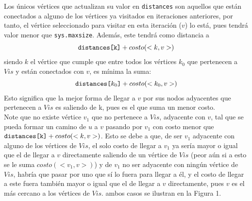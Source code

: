 \documentclass[a4paper,12pt,twocolumn]{article}
\begin{document}
			Los únicos vértices que actualizan su valor en \texttt{\ttfamily distances} son aquellos que están conectados a alguno de los vértices ya visitados en iteraciones anteriores, por tanto, el vértice seleccionado para visitar en esta iteración ($v$) lo está, pues tendrá valor menor que \texttt{\ttfamily sys.maxsize}. Además, este tendrá como distancia a $$\texttt{\ttfamily distances[k]}  +  costo(<k, v>)$$ siendo $k$ el vértice que cumple que entre todos los vértices $k_0$ que pertenecen a $Vis$ y están conectados con $v$, es mínima la suma:
			 $$ \texttt{\ttfamily distances[$k_0$]} + costo(<k_0,v>)$$
			Esto significa que la mejor forma de llegar a $v$ por sus nodos adyacentes que pertenecen a $Vis$ es saliendo de k, pues es el que suma un menor costo.\\
			Note que no existe vértice $v_1$ que no pertenece a $Vis$, adyacente con $v$, tal que se pueda formar un camino de $u$ a $v$ pasando por $v_1$ con costo menor que $\texttt{\ttfamily distances[k]} + costo(<k, v>)$.	Esto se debe a que, de ser $v_1$ adyacente con alguno de los vértices de $Vis$, el solo costo de llegar a $v_1$ ya sería mayor o igual que el de llegar a $v$ directamente saliendo de un vértice de $Vis$ (peor aún si a esto se le suma $costo(<v_1, v>)$) y de $v_1$ no ser adyacente con ningún vértice de $Vis$, habría que pasar por uno que sí lo fuera para llegar a él, y el costo de llegar a este fuera también mayor o igual que el de llegar a $v$ directamente, pues $v$ es el más cercano a los vértices de $Vis$. ambos casos se ilustran en la Figura 1.\\
\end{document}
